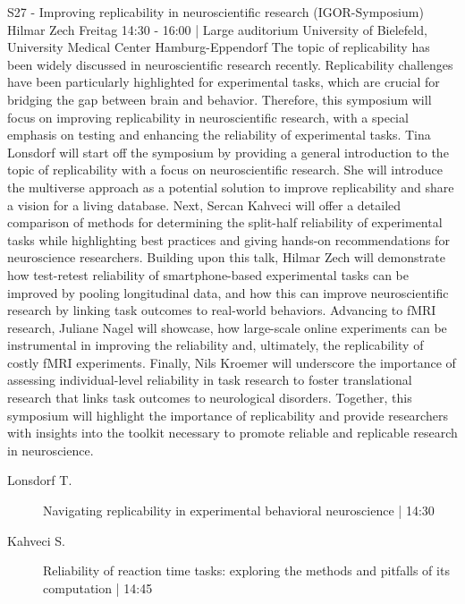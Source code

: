 
            \begin{symposium}
            {S27 - Improving replicability in neuroscientific research (IGOR-Symposium)}
            {Hilmar Zech}
            {Freitag 14:30 - 16:00 | Large auditorium}
            {University of Bielefeld, University Medical Center Hamburg-Eppendorf}
            The topic of replicability has been widely discussed in neuroscientific research recently. Replicability challenges have been particularly highlighted for experimental tasks, which are crucial for bridging the gap between brain and behavior. Therefore, this symposium will focus on improving replicability in neuroscientific research, with a special emphasis on testing and enhancing the reliability of experimental tasks. Tina Lonsdorf will start off the symposium by providing a general introduction to the topic of replicability with a focus on neuroscientific research. She will introduce the multiverse approach as a potential solution to improve replicability and share a vision for a living database. Next, Sercan Kahveci will offer a detailed comparison of methods for determining the split-half reliability of experimental tasks while highlighting best practices and giving hands-on recommendations for neuroscience researchers. Building upon this talk, Hilmar Zech will demonstrate how test-retest reliability of smartphone-based experimental tasks can be improved by pooling longitudinal data, and how this can improve neuroscientific research by linking task outcomes to real-world behaviors. Advancing to fMRI research, Juliane Nagel will showcase, how large-scale online experiments can be instrumental in improving the reliability and, ultimately, the replicability of costly fMRI experiments. Finally, Nils Kroemer will underscore the importance of assessing individual-level reliability in task research to foster translational research that links task outcomes to neurological disorders. Together, this symposium will highlight the importance of replicability and provide researchers with insights into the toolkit necessary to promote reliable and replicable research in neuroscience.
            \begin{description}    
            
                \item [ Lonsdorf T.] Navigating replicability in experimental behavioral neuroscience \textcolor{mygray}{ | 14:30}    
                
                \item [ Kahveci S.] Reliability of reaction time tasks: exploring the methods and pitfalls of its computation \textcolor{mygray}{ | 14:45}    
                

\end{description}
\end{symposium}
